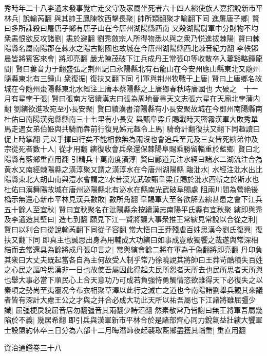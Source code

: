 秀時年二十八李通未發事覺亡走父守及家屬坐死者六十四人縯使族人嘉招說新市平林兵|{
	說輸芮翻}
與其帥王鳳陳牧西擊長聚|{
	帥所類翻聚才喻翻下同}
進屠唐子鄉|{
	賢曰多所誅殺曰屠唐子鄉有唐子山在今唐州湖陽縣西南}
又殺湖陽尉軍中分財物不均衆恚恨欲反攻諸劉|{
	恚於避翻}
劉秀斂宗人所得物悉以與之衆乃悦進拔棘陽|{
	賢曰棘陽縣名屬南陽郡在棘水之陽古謝國也故城在今唐州湖陽縣西北棘音紀力翻}
李軼鄧晨皆將賓客來會|{
	將即亮翻}
嚴尤陳茂破下江兵成丹王常張卬等收散卒入蔞谿略鍾龍間|{
	賢曰蔞音力于翻盛弘之荆州記曰永陽縣北有石龍山在今安州應山縣東北又隨州隨縣東北有三鍾山}
衆復振|{
	復扶又翻下同}
引軍與荆州牧戰于上唐|{
	賢曰上唐鄉名故城在今隨州棗陽縣東北水經注上唐本蔡陽縣之上唐鄉春秋時唐國也}
大破之　十一月有星孛于張|{
	賢曰張南方宿續漢志曰張為周地晉書天文志張六星在天廟北孛蒲内翻}
劉縯欲進攻宛至小長安聚|{
	賢曰續漢書淯陽縣有小長安聚故城在今鄧州南陽縣南杜佑曰南陽漢宛縣縣南三十七里有小長安}
與甄阜梁丘賜戰時天密霧漢軍大敗秀單馬走遇女弟伯姫與共騎而犇前行復見姊元趣令上馬|{
	騎奇計翻復扶又翻下同趣讀曰促上時掌翻}
元以手揮曰行矣不能相救無為兩沒也會追兵至元及三女皆死縯弟仲及宗從死者數十人|{
	從才用翻}
縯復收會兵衆還保棘陽阜賜乘勝留輜重於藍鄉|{
	賢曰北陽縣有藍鄉重直用翻}
引精兵十萬南度潢淳|{
	賢曰酈道元注水經曰諸水二湖流注合為黄水又南經棘陽縣之潢淳聚又謂之潢淳水在今唐州湖陽縣}
臨沘水|{
	水經注沘水出比陽縣東北大胡山南與澧水會謂之?水昔漢光武破甄阜梁丘賜於沘水西斬之於斯水也杜佑曰漢舞陽故城在唐州泌陽縣北有泌水在縣南光武破阜賜處}
阻兩川間為營絶後橋示無還心新市平林見漢兵數敗|{
	數所角翻}
阜賜軍大至各欲解去縯甚患之會下江兵五十餘人至宜秋|{
	賢曰宜秋聚名在沘陽縣余按續漢志南陽平氏縣有宜秋聚}
縯即與秀及李通造其壁曰|{
	造七到翻}
願見下江一賢將議大事衆推王常縯見常說以合從之利|{
	賢曰以利合曰從說輸芮翻下同從子容翻}
常大悟曰王莽殘虐百姓思漢今劉氏復興|{
	復扶又翻下同}
即真主也誠思出身為用輔成大功縯曰如事成豈敢獨饗之哉遂與常深相結而去常還具為餘將成丹張卬言之|{
	常與縯會餘二將在軍為于偽翻將即亮翻}
丹卬負其衆曰大丈夫既起當各自為主何故受人制乎常乃徐曉說其將帥曰王莽苛酷積失百姓之心民之謳吟思漢非一日也故使吾屬因此得起夫民所怨者天所去也民所思者天所與也舉大事必當下順民心上合天意功乃可成若負強恃勇觸情恣欲雖得天下必復失之以秦項之勢尚至夷覆况今布衣相聚草澤以此行之滅亡之道也今南陽諸劉舉兵觀其來議者皆有深計大慮王公之才與之并合必成大功此天所以祐吾屬也下江諸將雖屈彊少識|{
	屈彊梗戾貌屈音居勿翻彊音其兩翻少詩沼翻}
然素敬常乃皆謝曰無王將軍吾屬幾陷於不義|{
	幾居希翻}
即引兵與漢軍新市平林合於是諸部齊心同力銳氣益壯縯大饗軍士設盟約休卒三日分為六部十二月晦潛師夜起襲取藍鄉盡獲其輜重|{
	重直用翻}


資治通鑑卷三十八

